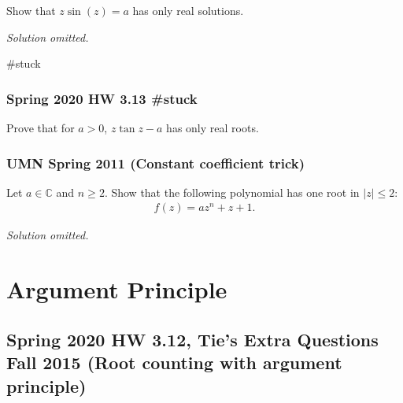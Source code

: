 \begin{problem}[?]

Show that \(z\sin(z) = a\) has only real solutions.

\end{problem}

\emph{Solution omitted.}

\#stuck

\hypertarget{spring-2020-hw-3.13-stuck}{%
\subsubsection{Spring 2020 HW 3.13
\#stuck}\label{spring-2020-hw-3.13-stuck}}

\begin{problem}[?]

Prove that for \(a> 0\), \(z\tan z - a\) has only real roots.

\end{problem}

\hypertarget{umn-spring-2011-constant-coefficient-trick}{%
\subsubsection{UMN Spring 2011 (Constant coefficient
trick)}\label{umn-spring-2011-constant-coefficient-trick}}

\begin{problem}[?]

Let \(a\in {\mathbb{C}}\) and \(n\geq 2\). Show that the following
polynomial has one root in \({\left\lvert {z} \right\rvert} \leq 2\):
\begin{align*}
f(z) = az^n + z + 1
.\end{align*}

\end{problem}

\emph{Solution omitted.}

\hypertarget{argument-principle}{%
\section{Argument Principle}\label{argument-principle}}

\hypertarget{spring-2020-hw-3.12-ties-extra-questions-fall-2015-root-counting-with-argument-principle}{%
\subsection{Spring 2020 HW 3.12, Tie's Extra Questions Fall 2015 (Root
counting with argument
principle)}\label{spring-2020-hw-3.12-ties-extra-questions-fall-2015-root-counting-with-argument-principle}}

